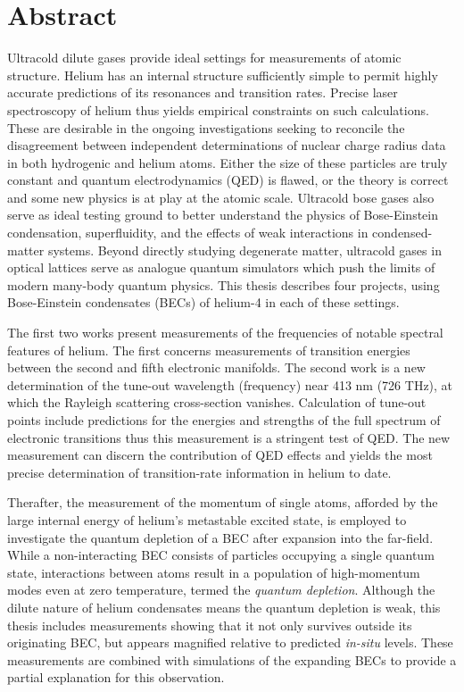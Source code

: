 \section*{Abstract}

Ultracold dilute gases provide ideal settings for measurements of atomic structure. 
Helium has an internal structure sufficiently simple to permit highly accurate predictions of its resonances and transition rates.
Precise laser spectroscopy of helium thus yields empirical constraints on such calculations.
These are desirable in the ongoing investigations seeking to reconcile the disagreement between independent determinations of nuclear charge radius data in both hydrogenic and helium atoms.
Either the size of these particles are truly constant and quantum electrodynamics (QED) is flawed, or the theory is correct and some new physics is at play at the atomic scale.
Ultracold bose gases also serve as ideal testing ground to better understand the physics of Bose-Einstein condensation, superfluidity, and the effects of weak interactions in condensed-matter systems.
Beyond directly studying degenerate matter, ultracold gases in optical lattices serve as analogue quantum simulators which push the limits of modern many-body quantum physics. 
This thesis describes four projects, using Bose-Einstein condensates (BECs) of helium-4 in each of these settings.

The first two works present measurements of the frequencies of notable spectral features of helium.
The first concerns measurements of transition energies between the second and fifth electronic manifolds.
The second work is a new determination of the tune-out wavelength (frequency) near 413 nm (726 THz), at which the Rayleigh scattering cross-section vanishes. 
Calculation of tune-out points include predictions for the energies and strengths of the full spectrum of electronic transitions thus this measurement is a stringent test of QED.
The new measurement can discern the contribution of QED effects and yields the most precise determination of transition-rate information in helium to date.

Therafter, the measurement of the momentum of single atoms, afforded by the large internal energy of helium's metastable excited state, is employed to investigate the quantum depletion of a BEC after expansion into the far-field.
While a non-interacting BEC consists of particles occupying a single quantum state, interactions between atoms result in a population of high-momentum modes even at zero temperature, termed the \emph{quantum depletion}.
Although the dilute nature of helium condensates means the quantum depletion is weak, this thesis includes measurements showing that it not only survives outside its originating BEC, but appears magnified relative to predicted \emph{in-situ} levels.
These measurements are combined with simulations of the expanding BECs to provide a partial explanation for this observation.



